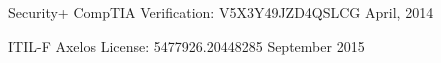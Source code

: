 \cventry
{Security+} %
{CompTIA} %
{Verification:  V5X3Y49JZD4QSLCG} %
{April, 2014} %
{} %

\cventry
{ITIL-F} %
{Axelos} %
{License: 5477926.20448285} %
{September 2015} %
{} %